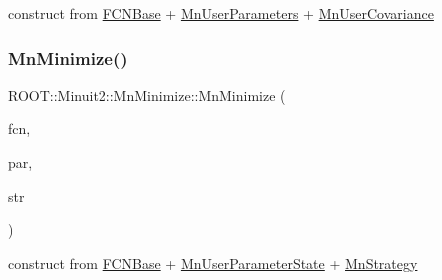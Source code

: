 construct from \mbox{\hyperlink{classROOT_1_1Minuit2_1_1FCNBase}{F\+C\+N\+Base}} + \mbox{\hyperlink{classROOT_1_1Minuit2_1_1MnUserParameters}{Mn\+User\+Parameters}} + \mbox{\hyperlink{classROOT_1_1Minuit2_1_1MnUserCovariance}{Mn\+User\+Covariance}} 

\mbox{\label{classROOT_1_1Minuit2_1_1MnMinimize_ac07d9fb89fb1a8cdef14ece12eabbfda}} 
\subsubsection{\texorpdfstring{MnMinimize()}{MnMinimize()}\hspace{0.1cm}{\footnotesize\ttfamily [19/26]}}
{\footnotesize\ttfamily R\+O\+O\+T\+::\+Minuit2\+::\+Mn\+Minimize\+::\+Mn\+Minimize (\begin{DoxyParamCaption}\item[{const \mbox{\hyperlink{classROOT_1_1Minuit2_1_1FCNBase}{F\+C\+N\+Base}} \&}]{fcn,  }\item[{const \mbox{\hyperlink{classROOT_1_1Minuit2_1_1MnUserParameterState}{Mn\+User\+Parameter\+State}} \&}]{par,  }\item[{const \mbox{\hyperlink{classROOT_1_1Minuit2_1_1MnStrategy}{Mn\+Strategy}} \&}]{str }\end{DoxyParamCaption})\hspace{0.3cm}{\ttfamily [inline]}}



construct from \mbox{\hyperlink{classROOT_1_1Minuit2_1_1FCNBase}{F\+C\+N\+Base}} + \mbox{\hyperlink{classROOT_1_1Minuit2_1_1MnUserParameterState}{Mn\+User\+Parameter\+State}} + \mbox{\hyperlink{classROOT_1_1Minuit2_1_1MnStrategy}{Mn\+Strategy}} 

\mbox{\label{classROOT_1_1Minuit2_1_1MnMinimize_a838683666517f1099a8eff7654dff3e2}} 
